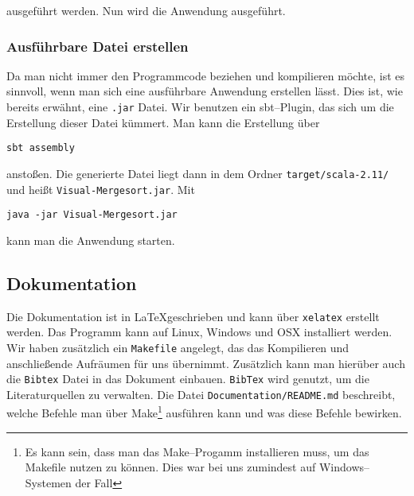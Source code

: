 ausgeführt werden. Nun wird die Anwendung ausgeführt.

\subsubsection{Ausführbare Datei erstellen}
Da man nicht immer den Programmcode beziehen und kompilieren möchte, ist es sinnvoll, wenn man sich eine ausführbare Anwendung erstellen lässt. Dies ist, wie bereits erwähnt, eine \texttt{.jar} Datei. Wir benutzen ein sbt--Plugin, das sich um die Erstellung dieser Datei kümmert. Man kann die Erstellung über

\begin{verbatim}
sbt assembly
\end{verbatim}

anstoßen. Die generierte Datei liegt dann in dem Ordner \texttt{target/scala-2.11/} und heißt \texttt{Visual-Mergesort.jar}. Mit

\begin{verbatim}
java -jar Visual-Mergesort.jar
\end{verbatim}

kann man die Anwendung starten.

\subsection{Dokumentation}\label{sec:latex}

Die Dokumentation ist in \LaTeX geschrieben und kann über \texttt{xelatex} erstellt werden. Das Programm kann auf Linux, Windows und OSX installiert werden. Wir haben zusätzlich ein \texttt{Makefile} angelegt, das das Kompilieren und anschließende Aufräumen für uns übernimmt. Zusätzlich kann man hierüber auch die \texttt{Bibtex} Datei in das Dokument einbauen. \texttt{BibTex} wird genutzt, um die Literaturquellen zu verwalten. Die Datei \texttt{Documentation/README.md} beschreibt, welche Befehle man über Make\footnote{Es kann sein, dass man das Make--Progamm installieren muss, um das Makefile nutzen zu können. Dies war bei uns zumindest auf Windows--Systemen der Fall} ausführen kann und was diese Befehle bewirken.
